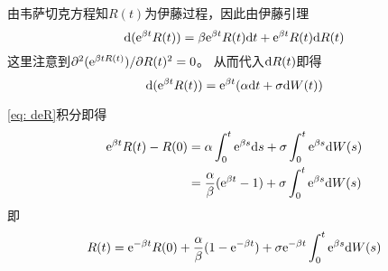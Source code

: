 \documentclass[cn]{homework}
\begin{document}
    \problem[习题4.8]
    \begin{subproblem}
        \item
        由韦萨切克方程知$R(t)$为伊藤过程，因此由伊藤引理
        \[\mathrm d (\mathrm e^{\beta t}R(t))=\beta\mathrm e^{\beta t}R(t)\mathrm d t
        +\mathrm e^{\beta t}R(t)\mathrm d R(t)\]
        这里注意到$\partial^2(\mathrm e^{\beta tR(t)})/\partial R(t)^2=0$。
        从而代入$\mathrm d R(t)$即得
        \begin{equation}
            \label{eq: deR}
            \mathrm d (\mathrm e^{\beta t}R(t))=\mathrm e^{\beta t}(\alpha\mathrm d t+\sigma\mathrm d W(t))
        \end{equation}

        \item
        \cref{eq: deR}积分即得
        \[\begin{aligned}
            \mathrm e^{\beta t}R(t)-R(0)&=\alpha\int_0^t\mathrm e^{\beta s}\mathrm d s
            +\sigma\int_0^t\mathrm e^{\beta s}\mathrm d W(s)\\
            &=\frac{\alpha}{\beta}(\mathrm e^{\beta t}-1)+\sigma\int_0^t\mathrm e^{\beta s}\mathrm d W(s)
        \end{aligned}\]
        即
        \[R(t)=\mathrm e^{-\beta t}R(0)+\frac{\alpha}{\beta}(1-\mathrm e^{-\beta t})
        +\sigma\mathrm e^{-\beta t}\int_0^t\mathrm e^{\beta s}\mathrm d W(s)\]
    \end{subproblem}
\end{document}
